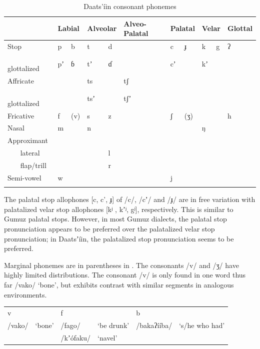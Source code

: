\documentclass[output=paper]{langsci/langscibook}
\begin{document}
\begin{table}
\begin{tabularx}{\textwidth}{lXXXXXXXXXXXX} \lsptoprule & \multicolumn{2}{X}{Labial} & \multicolumn{2}{X}{Alveolar} & \multicolumn{2}{X}{Alveo-Palatal} & \multicolumn{2}{X}{Palatal} & \multicolumn{2}{X}{Velar} & \multicolumn{2}{X}{Glottal} \\
\midrule
Stop & p   &     b & t    &      d &  &  & c     &    ɟ & k    &    g & ʔ& \\
{\ \ \ } glottalized & pʼ    &   ɓ & tʼ     &    ɗ & &  & cʼ & & kʼ & & & \\
Affricate & & & ts & & tʃ & & &  &  & & & \\
{\ \ \ } glottalized & & & tsʼ & & tʃʼ & & & & & & & \\
Fricative & f    &    (v) & s     &     z &  & & ʃ    &     (ʒ) & &  & h & \\
Nasal & m & & n & & &  & &  & ŋ & & & \\
Approximant & & & & & & & & & & & & \\
{\ \ \ } lateral & &  & & l & &  & &  & &  & & \\
{\ \ \ } flap/trill & &  & & r & & & & & & & & \\
Semi-vowel & w & & &  &  & & j & & &  & & \\
\lspbottomrule
\end{tabularx}
\caption{Daats’\'{i}in consonant phonemes}
\label{tab:ahlandc:1}
\end{table}

The palatal stop allophones [c, c’, ɟ] of /c/, /cʼ/ and /ɟ/ are in free variation with palatalized velar stop allophones [kʲ , kʼʲ, gʲ], respectively. This is similar to Gumuz palatal stops. However, in most Gumuz dialects, the palatal stop pronunciation appears to be preferred over the palatalized velar stop pronunciation; in Daatsʼ\'{i}in, the palatalized stop pronunciation seems to be preferred. 

Marginal phonemes are in parentheses in . The consonants /v/ and /ʒ/ have highly limited distributions. The consonant /v/ is only found in one word thus far /vako/ ‘bone’, but exhibits contrast with similar segments in analogous environments. 

\begin{tabular}{llllll}
v & & f & & b & \\
/vako/   &  ‘bone’  &   /fago/  &   ‘be drunk’  & /bakaʔ\'{i}\'{i}ba/ & ‘s/he who had’  \\           
& & /kʼ\'{o}faku/ &  ‘navel’ & & \\
\end{tabular}
\end{document}
